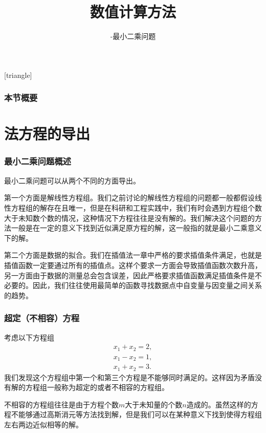 \documentclass[10pt]{beamer}
\title[数值计算方法]{数值计算方法}
\subtitle{-最小二乘问题}
\begin{document}
[triangle]

\begin{frame}
\titlepage
\end{frame}


\begin{frame}
  \frametitle{本节概要}
  \tableofcontents%
\end{frame}

\section{法方程的导出}

\begin{frame}
\frametitle{最小二乘问题概述}
最小二乘问题可以从两个不同的方面导出。

\vspace{0.2cm}

第一个方面是解线性方程组。我们之前讨论的解线性方程组的问题都一般都假设线性方程组的解存在且唯一，但是在科研和工程实践中，我们有时会遇到方程组个数大于未知数个数的情况，这种情况下方程往往是没有解的。我们解决这个问题的方法一般是在一定的意义下找到近似满足原方程的解，这一般指的就是最小二乘意义下的解。

\vspace{0.2cm}

第二个方面是数据的拟合。我们在插值法一章中严格的要求插值条件满足，也就是插值函数一定要通过所有的插值点。这样个要求一方面会导致插值函数次数升高，另一方面由于数据的测量总会包含误差，因此严格要求插值函数满足插值条件是不必要的。因此，我们往往使用最简单的函数寻找数据点中自变量与因变量之间关系的趋势。

\vspace{0.2cm}
\end{frame}

\begin{frame}
\frametitle{超定（不相容）方程}
考虑以下方程组
\begin{align}
\label{eq: least square eq 1}
x_1 + x_2 = 2, \nonumber \\
x_1 - x_2 = 1, \nonumber \\
x_1 + x_2 = 3.
\end{align}
我们发现这个方程组中第一个和第三个方程是不能够同时满足的。这样因为矛盾没有解的方程组一般称为超定的或者不相容的方程组。

\vspace{0.2cm}

不相容的方程组往往是由于方程个数$m$大于未知量的个数$n$造成的。虽然这样的方程不能够通过高斯消元等方法找到解，但是我们可以在某种意义下找到使得方程组左右两边近似相等的解。
\end{frame}
\end{document}

